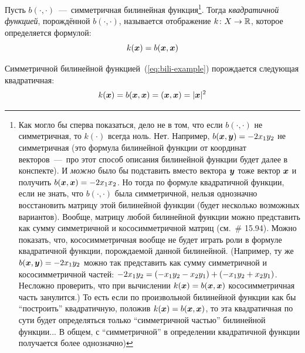 \documentclass[a4paper,12pt]{article}
\begin{document}
  \begin{definition}
    Пусть $b(\cdot, \cdot)$~---~симметричная билинейная функция\footnote{
      Как могло бы сперва показаться, дело не в том, что если $b(\cdot, \cdot)$ не симметричная, то $k(\cdot)$ всегда ноль.
      Нет.
      Например, $b(\bds x, \bds y) \hm= -2 x_1 y_2$ не симметричная (это формула билинейной функции от координат векторов~---~про этот способ описания билинейной функции будет далее в конспекте).
      И \emph{можно} было бы подставить вместо вектора $\boldsymbol y$ тоже вектор $\boldsymbol x$ и получить $b(\bds x, \bds x) \hm= -2 x_1 x_2$.
      Но тогда по формуле квадратичной функции, если не знать, что $b(\cdot, \cdot)$ была симметричной, нельзя однозначно восстановить матрицу этой билинейной функции (будет несколько возможных вариантов).
      Вообще, матрицу любой билинейной функции можно представить как сумму симметричной и кососимметричной матриц (см.~\# 15.94).
      Можно показать, что, кососимметричная вообще не будет играть роли в формуле квадратичной функции, порождаемой данной билинейной.
      (Например, ту же $b(\bds x, \bds y) \hm= -2 x_1 y_2$ можно так представить как сумму симметричной и кососимметричной частей: $-2 x_1 y_2 \hm= (-x_1 y_2 \hm- x_2 y_1) \hm+ (-x_1 y_2 \hm+ x_2 y_1)$.
      Несложно проверить, что при вычислении $k(\bds x) \hm= b(\bds x, \bds x)$ кососимметричная часть занулится.)
      То есть если по произвольной билинейной функции как бы ``построить'' квадратичную, положив $k(\bds x) \hm= b(\bds x, \bds x)$, то эта квадратичная по сути будет определяться только ``симметричной частью'' билинейной функции...
      В общем, с ``симметричной'' в определении квадратичной функции получается более однозначно)
    }.  %
    Тогда \emph{квадратичной функцией}, порождённой $b(\cdot, \cdot)$, называется отображение $k\colon X \hm\to \RR$, которое определяется формулой:
    \[
      k(\boldsymbol x) = b(\boldsymbol x, \boldsymbol x)
    \]
  \end{definition}
  
  \begin{eqexample}
    Симметричной билинейной функцией~(\ref{eq:bili-example}) порождается следующая квадратичная:
    \begin{equation}\label{eq:qua-example}
      k(\boldsymbol x) = b(\boldsymbol x, \boldsymbol x) = (\boldsymbol x, \boldsymbol x) = |\boldsymbol x|^2
    \end{equation}
  \end{eqexample}
  
\end{document}
